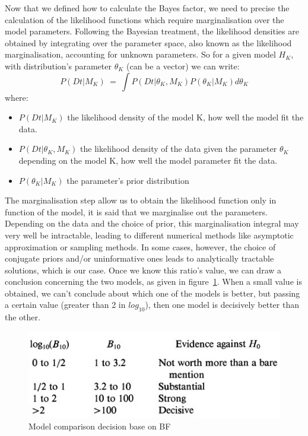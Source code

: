 \documentclass[twocolumn]{article}
\begin{document}
Now that we defined how to calculate the Bayes factor, we need to precise the calculation of the likelihood functions which require marginalisation over the model parameters.
Following the Bayesian treatment, the likelihood densities are obtained by integrating over the parameter space, also known as the likelihood marginalisation, accounting for unknown parameters.
So for a given model $H_K$, with distribution's parameter $\theta_K$ (can be a vector) we can write:
\begin{equation}
    P(Dt|M_K)\ =\ \int P(Dt|\theta_K,M_K)P(\theta_K|M_K)d\theta_K
    \label{equ:MargMod}
\end{equation}
where:
\begin{itemize}
    \item $P(Dt|M_K)$ the likelihood density of the model K, how well the model fit the data.
    \item $P(Dt|\theta_K,M_K)$ the likelihood density of the data given the parameter $\theta_K$ depending on the model K, how well the model parameter fit the data.
    \item $P(\theta_K|M_K)$ the parameter's prior distribution
\end{itemize}
The marginalisation step allow us to obtain the likelihood function only in function of the model, it is said that we marginalise out the parameters.
Depending on the data and the choice of prior, this marginalisation integral may very well be intractable, leading to different numerical methods like asymptotic approximation or sampling methods\cite{raftery}.
In some cases, however, the choice of conjugate priors and/or uninformative ones leads to analytically tractable solutions, which is our case.
Once we know this ratio's value, we can draw a conclusion concerning the two models, as given in figure~\ref{fig:compRatio}.
When a small value is obtained, we can't conclude about which one of the models is better, but passing a certain value (greater than 2 in $log_{10}$), then one model is decisively better than the other.
\begin{figure}[!]
    \centering
    \includegraphics[scale=0.6]{img/BFratios.jpg}
    \caption{Model comparison decision base on BF}
    \label{fig:compRatio}
\end{figure}
\end{document}
